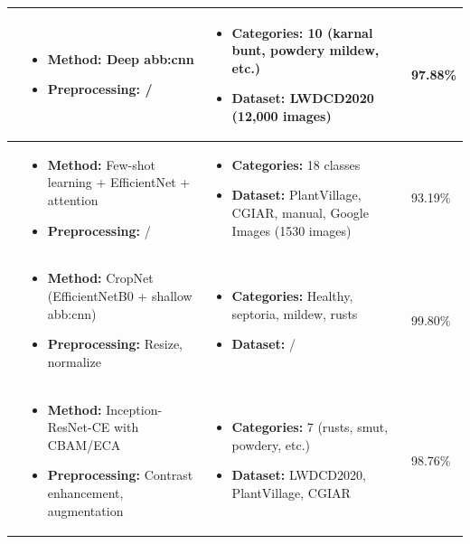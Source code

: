\begin{longtable}{|p{3cm}|p{6cm}|p{3.5cm}|p{2.5cm}|}
\parencite{goyal2021leaf} &
\begin{itemize}
    \item \textbf{Method:} Deep \gls{abb:cnn}
    \item \textbf{Preprocessing:} /
\end{itemize} &
\begin{itemize}
    \item \textbf{Categories:} 10 (karnal bunt, powdery mildew, etc.)
    \item \textbf{Dataset:} LWDCD2020 (12,000 images)
\end{itemize} &
97.88\% \\
\hline

\parencite{alharbi2023wheat} &
\begin{itemize}
    \item \textbf{Method:} Few-shot learning + EfficientNet + attention
    \item \textbf{Preprocessing:} /
\end{itemize} &
\begin{itemize}
    \item \textbf{Categories:} 18 classes
    \item \textbf{Dataset:} PlantVillage, CGIAR, manual, Google Images (1530 images)
\end{itemize} &
93.19\% \\
\hline

\parencite{jouini2024wheat} &
\begin{itemize}
    \item \textbf{Method:} CropNet (EfficientNetB0 + shallow \gls{abb:cnn})
    \item \textbf{Preprocessing:} Resize, normalize
\end{itemize} &
\begin{itemize}
    \item \textbf{Categories:} Healthy, septoria, mildew, rusts
    \item \textbf{Dataset:} /
\end{itemize} &
99.80\% \\
\hline

\parencite{fang2023lightweight} &
\begin{itemize}
    \item \textbf{Method:} Inception-ResNet-CE with CBAM/ECA
    \item \textbf{Preprocessing:} Contrast enhancement, augmentation
\end{itemize} &
\begin{itemize}
    \item \textbf{Categories:} 7 (rusts, smut, powdery, etc.)
    \item \textbf{Dataset:} LWDCD2020, PlantVillage, CGIAR
\end{itemize} &
98.76\% \\
\hline


\end{longtable}
